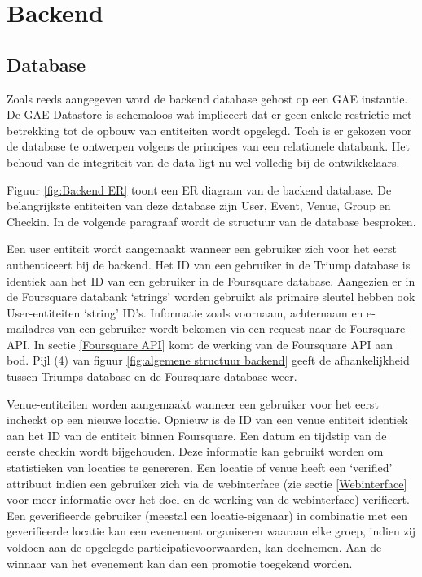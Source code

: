 \section{Backend}
\subsection{Database}
Zoals reeds aangegeven word de backend database gehost op een GAE instantie. De GAE Datastore is schemaloos wat impliceert dat er geen enkele restrictie met betrekking tot de opbouw van entiteiten wordt opgelegd. Toch is er gekozen voor de database te ontwerpen volgens de principes van een relationele databank. Het behoud van de integriteit van de data ligt nu wel volledig bij de ontwikkelaars. 

Figuur \ref{fig:Backend ER} toont een ER diagram van de backend database.  De belangrijkste entiteiten van deze database zijn User, Event, Venue, Group en Checkin. In de volgende paragraaf wordt de structuur van de database besproken. 

Een user entiteit wordt aangemaakt wanneer een gebruiker zich voor het eerst authenticeert bij de backend. Het ID van een gebruiker in de Triump database is identiek aan het ID van een gebruiker in de Foursquare database. Aangezien er in de Foursquare databank `strings' worden gebruikt als primaire sleutel hebben ook User-entiteiten `string' ID's.  Informatie zoals voornaam, achternaam en e-mailadres van een gebruiker wordt bekomen via een request naar de Foursquare API. In sectie \ref{Foursquare API} komt de werking van de Foursquare API aan bod. Pijl (4) van figuur \ref{fig:algemene structuur backend} geeft de afhankelijkheid tussen Triumps database en de Foursquare database weer.

Venue-entiteiten worden aangemaakt wanneer een gebruiker voor het eerst incheckt op een nieuwe locatie. Opnieuw is de ID van een venue entiteit identiek aan het ID van de entiteit binnen Foursquare. Een datum en tijdstip van de eerste checkin wordt bijgehouden. Deze informatie kan gebruikt worden om statistieken van locaties te genereren. Een locatie of venue heeft een `verified' attribuut indien een gebruiker zich via de webinterface (zie sectie \ref{Webinterface} voor meer informatie over het doel en de werking van de webinterface) verifieert. Een geverifieerde gebruiker (meestal een locatie-eigenaar) in combinatie met een geverifieerde locatie kan een evenement organiseren waaraan elke groep, indien zij voldoen aan de opgelegde participatievoorwaarden, kan deelnemen. Aan de winnaar van het evenement kan dan een promotie toegekend worden.

